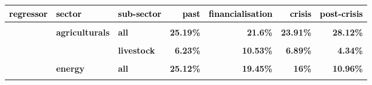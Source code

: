 \documentclass[
  authoryear,
  preprint,
  3p]{elsarticle}
\begin{document}
\begin{longtable}[t]{>{}l>{}l>{}l>{}r>{}r>{}r>{}r}
\toprule
\textcolor{black}{\textbf{regressor}} & \textcolor{black}{\textbf{sector}} & \textcolor{black}{\textbf{sub-sector}} & \textcolor{black}{\textbf{past}} & \textcolor{black}{\textbf{financialisation}} & \textcolor{black}{\textbf{crisis}} & \textcolor{black}{\textbf{post-crisis}}\\
\midrule
\textbf{\cellcolor{gray!10}{Δ\% commodity CHP}} & \textbf{\cellcolor{gray!10}{all}} & \textbf{\cellcolor{gray!10}{all}} & \textcolor[HTML]{4285f4}{\textbf{\cellcolor{gray!10}{25.79\%}}} & \textcolor[HTML]{4285f4}{\textbf{\cellcolor{gray!10}{20.72\%}}} & \textcolor[HTML]{4285f4}{\textbf{\cellcolor{gray!10}{22.46\%}}} & \textcolor[HTML]{4285f4}{\textbf{\cellcolor{gray!10}{27.17\%}}}\\
\textbf{} & \textbf{agriculturals} & \textbf{all} & \textcolor[HTML]{4285f4}{\textbf{25.19\%}} & \textcolor[HTML]{4285f4}{\textbf{21.6\%}} & \textcolor[HTML]{4285f4}{\textbf{23.91\%}} & \textcolor[HTML]{4285f4}{\textbf{28.12\%}}\\
\textbf{\cellcolor{gray!10}{}} & \textbf{\cellcolor{gray!10}{}} & \textbf{\cellcolor{gray!10}{grains}} & \textcolor[HTML]{4285f4}{\textbf{\cellcolor{gray!10}{33.18\%}}} & \textcolor[HTML]{4285f4}{\textbf{\cellcolor{gray!10}{27.86\%}}} & \textcolor[HTML]{4285f4}{\textbf{\cellcolor{gray!10}{29.15\%}}} & \textcolor[HTML]{4285f4}{\textbf{\cellcolor{gray!10}{36.24\%}}}\\
\textbf{} & \textbf{} & \textbf{livestock} & \textcolor[HTML]{4285f4}{\textbf{6.23\%}} & \textcolor[HTML]{4285f4}{\textbf{10.53\%}} & \textcolor[HTML]{4285f4}{\textbf{6.89\%}} & \textcolor[HTML]{4285f4}{\textbf{4.34\%}}\\
\textbf{\cellcolor{gray!10}{}} & \textbf{\cellcolor{gray!10}{}} & \textbf{\cellcolor{gray!10}{softs}} & \textcolor[HTML]{4285f4}{\textbf{\cellcolor{gray!10}{26.68\%}}} & \textcolor[HTML]{4285f4}{\textbf{\cellcolor{gray!10}{20.89\%}}} & \textcolor[HTML]{4285f4}{\textbf{\cellcolor{gray!10}{27.19\%}}} & \textcolor[HTML]{4285f4}{\textbf{\cellcolor{gray!10}{31.88\%}}}\\
\addlinespace
\textbf{} & \textbf{energy} & \textbf{all} & \textcolor[HTML]{4285f4}{\textbf{25.12\%}} & \textcolor[HTML]{4285f4}{\textbf{19.45\%}} & \textcolor[HTML]{4285f4}{\textbf{16\%}} & \textcolor[HTML]{4285f4}{\textbf{10.96\%}}\\
\textbf{\cellcolor{gray!10}{}} & \textbf{\cellcolor{gray!10}{}} & \textbf{\cellcolor{gray!10}{gas}} & \textcolor[HTML]{4285f4}{\textbf{\cellcolor{gray!10}{19.69\%}}} & \textcolor[HTML]{4285f4}{\textbf{\cellcolor{gray!10}{15.65\%}}} & \textcolor[HTML]{4285f4}{\textbf{\cellcolor{gray!10}{7.36\%}}} & \textcolor[HTML]{4285f4}{\textbf{\cellcolor{gray!10}{5.29\%}}}\\

\end{longtable}
\end{document}
